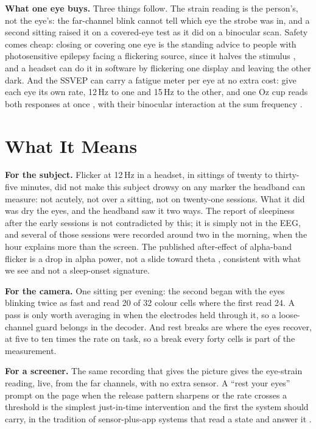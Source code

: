 \documentclass[conference]{IEEEtran}
\begin{document}
\textbf{What one eye buys.} Three things follow. The strain reading is the person's, not the eye's: the far-channel blink cannot tell which eye the strobe was in, and a second sitting raised it on a covered-eye test as it did on a binocular scan. Safety comes cheap: closing or covering one eye is the standing advice to people with photosensitive epilepsy facing a flickering source, since it halves the stimulus \cite{tychsen2020vr}, and a headset can do it in software by flickering one display and leaving the other dark. And the SSVEP can carry a fatigue meter per eye at no extra cost: give each eye its own rate, 12\,Hz to one and 15\,Hz to the other, and one Oz cup reads both responses at once \cite{brown1997rivalry}, with their binocular interaction at the sum frequency \cite{baker2017optimal}.

\section{What It Means}

\textbf{For the subject.} Flicker at 12\,Hz in a headset, in sittings of twenty to thirty-five minutes, did not make this subject drowsy on any marker the headband can measure: not acutely, not over a sitting, not on twenty-one sessions. What it did was dry the eyes, and the headband saw it two ways. The report of sleepiness after the early sessions is not contradicted by this; it is simply not in the EEG, and several of those sessions were recorded around two in the morning, when the hour explains more than the screen. The published after-effect of alpha-band flicker is a drop in alpha power, not a slide toward theta \cite{herrmann2001flicker}, consistent with what we see and not a sleep-onset signature.

\textbf{For the camera.} One sitting per evening: the second began with the eyes blinking twice as fast and read 20 of 32 colour cells where the first read 24. A pass is only worth averaging in when the electrodes held through it, so a loose-channel guard belongs in the decoder. And rest breaks are where the eyes recover, at five to ten times the rate on task, so a break every forty cells is part of the measurement.

\textbf{For a screener.} The same recording that gives the picture gives the eye-strain reading, live, from the far channels, with no extra sensor. A ``rest your eyes'' prompt on the page when the release pattern sharpens or the rate crosses a threshold is the simplest just-in-time intervention \cite{nahum2018jitai} and the first the system should carry, in the tradition of sensor-plus-app systems that read a state and answer it \cite{fletcher2011cbt, boyer2012iheal, leonard2018homeless}.
\end{document}
